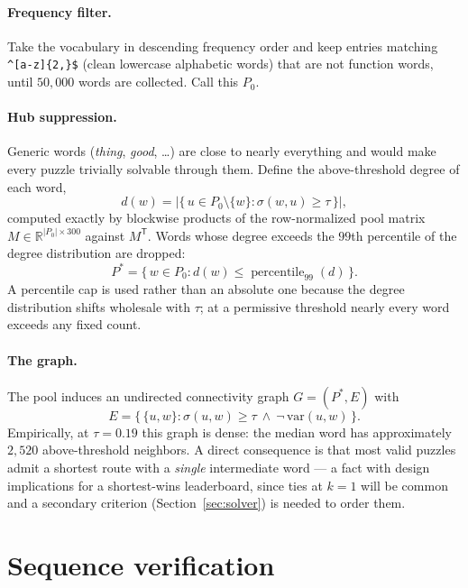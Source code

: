 \documentclass[11pt]{article}
\newcommand{\cosim}{\sigma}
\newcommand{\thresh}{\tau}
\begin{document}
\paragraph{Frequency filter.}
Take the vocabulary in descending frequency order and keep entries matching
\verb|^[a-z]{2,}$| (clean lowercase alphabetic words) that are not function
words, until $50{,}000$ words are collected. Call this $P_0$.

\paragraph{Hub suppression.}
Generic words (\emph{thing}, \emph{good}, \dots) are close to nearly
everything and would make every puzzle trivially solvable through them. Define
the above-threshold degree of each word,
\[
  d(w) = \bigl|\{\, u \in P_0 \setminus \{w\} : \cosim(w, u) \ge \thresh \,\}\bigr|,
\]
computed exactly by blockwise products of the row-normalized pool matrix
$M \in \mathbb{R}^{|P_0| \times 300}$ against $M^{\mathsf T}$. Words whose
degree exceeds the $99$th percentile of the degree distribution are dropped:
\[
  P^\ast = \{\, w \in P_0 : d(w) \le \operatorname{percentile}_{99}(d) \,\}.
\]
A percentile cap is used rather than an absolute one because the degree
distribution shifts wholesale with $\thresh$; at a permissive threshold nearly
every word exceeds any fixed count.

\paragraph{The graph.}
The pool induces an undirected connectivity graph $G = (P^\ast, E)$ with
\[
  E = \bigl\{\, \{u, w\} : \cosim(u, w) \ge \thresh
  \ \wedge\ \neg\,\mathrm{var}(u, w) \,\bigr\}.
\]
Empirically, at $\thresh = 0.19$ this graph is dense: the median word has
approximately $2{,}520$ above-threshold neighbors. A direct consequence is
that most valid puzzles admit a shortest route with a \emph{single}
intermediate word --- a fact with design implications for a shortest-wins
leaderboard, since ties at $k = 1$ will be common and a secondary criterion
(Section~\ref{sec:solver}) is needed to order them.

\section{Sequence verification}
\end{document}
